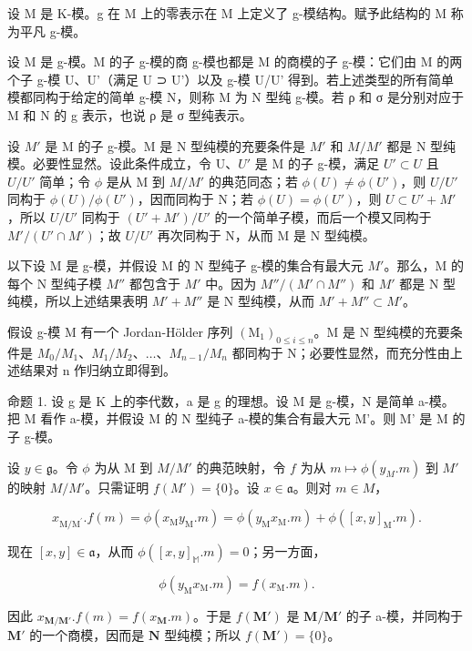 设 M 是 K-模。g 在 M 上的零表示在 M 上定义了 g-模结构。赋予此结构的 M 称为平凡 g-模。

设 M 是 g-模。M 的子 g-模的商 g-模也都是 M 的商模的子 g-模：它们由 M 的两个子 g-模 U、U'（满足 U ⊃ U'）以及 g-模 U/U' 得到。若上述类型的所有简单模都同构于给定的简单 g-模 N，则称 M 为 N 型纯 g-模。若 ρ 和 σ 是分别对应于 M 和 N 的 g 表示，也说 ρ 是 σ 型纯表示。

设 \(M'\) 是 M 的子 g-模。M 是 N 型纯模的充要条件是 \(M'\) 和 \(M/M'\) 都是 N 型纯模。必要性显然。设此条件成立，令 U、\(U'\) 是 M 的子 g-模，满足 \(U' \subset U\) 且 \(U/U'\) 简单；令 \(\phi\) 是从 M 到 \(M/M'\) 的典范同态；若 \(\phi(U) \neq \phi(U')\)，则 \(U/U'\) 同构于 \(\phi(U)/\phi(U')\)，因而同构于 N；若 \(\phi(U) = \phi(U')\)，则 \(U \subset U' + M'\)，所以 \(U/U'\) 同构于 \((U' + M')/U'\) 的一个简单子模，而后一个模又同构于 \(M'/(U' \cap M')\)；故 \(U/U'\) 再次同构于 N，从而 M 是 N 型纯模。

以下设 M 是 g-模，并假设 M 的 N 型纯子 g-模的集合有最大元 \(M'\)。那么，M 的每个 N 型纯子模 \(M''\) 都包含于 \(M'\) 中。因为 \(M''/(M' \cap M'')\) 和 \(M'\) 都是 N 型纯模，所以上述结果表明 \(M' + M''\) 是 N 型纯模，从而 \(M' + M'' \subset M'\)。

假设 g-模 M 有一个 Jordan-Hölder 序列 \((\mathrm{M}_{1})_{0\leqslant i\leqslant n}\)。M 是 N 型纯模的充要条件是 \(M_{0}/M_{1}\)、\(M_{1}/M_{2}\)、\(\ldots\)、\(M_{n-1}/M_{n}\) 都同构于 N；必要性显然，而充分性由上述结果对 n 作归纳立即得到。

命题 1. 设 g 是 K 上的李代数，a 是 g 的理想。设 M 是 g-模，N 是简单 a-模。把 M 看作 a-模，并假设 M 的 N 型纯子 a-模的集合有最大元 M'。则 M' 是 M 的子 g-模。

设 \(y \in \mathfrak{g}\)。令 \(\phi\) 为从 M 到 \(M / M'\) 的典范映射，令 \(f\) 为从 \(m \mapsto \phi(y_M. m)\) 到 \(M'\) 的映射 \(M / M'\)。只需证明 \(f(M') = \{0\}\)。设 \(x \in \mathfrak{a}\)。则对 \(m \in M\)，

\[
x _ {\mathrm{M} / \mathrm{M} ^ {\prime}}. f (m) = \phi (x _ {\mathrm{M}} y _ {\mathrm{M}}. m) = \phi (y _ {\mathrm{M}} x _ {\mathrm{M}}. m) + \phi ([ x, y ] _ {\mathrm{M}}. m).
\]

现在 \([x,y] \in \mathfrak{a}\)，从而 \(\phi([x,y]_{\mathbb{M}}.m) = 0\)；另一方面，

\[
\phi (y _ {\mathrm{M}} x _ {\mathrm{M}}. m) = f (x _ {\mathrm{M}}. m).
\]

因此 \(x_{\mathbf{M} / \mathbf{M}'} . f(m) = f(x_{\mathbf{M}}.m)\)。于是 \(f(\mathbf{M}')\) 是 \(\mathbf{M} / \mathbf{M}'\) 的子 a-模，并同构于 \(\mathbf{M}'\) 的一个商模，因而是 \(\mathbf{N}\) 型纯模；所以 \(f(\mathbf{M}') = \{0\}\)。


